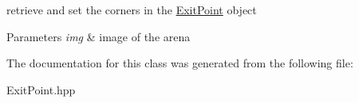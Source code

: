 retrieve and set the corners in the \mbox{\hyperlink{class_exit_point}{Exit\+Point}} object 
\begin{DoxyParams}{Parameters}
{\em img} & image of the arena \\
\hline
\end{DoxyParams}


The documentation for this class was generated from the following file\+:\begin{DoxyCompactItemize}
\item 
Exit\+Point.\+hpp\end{DoxyCompactItemize}
